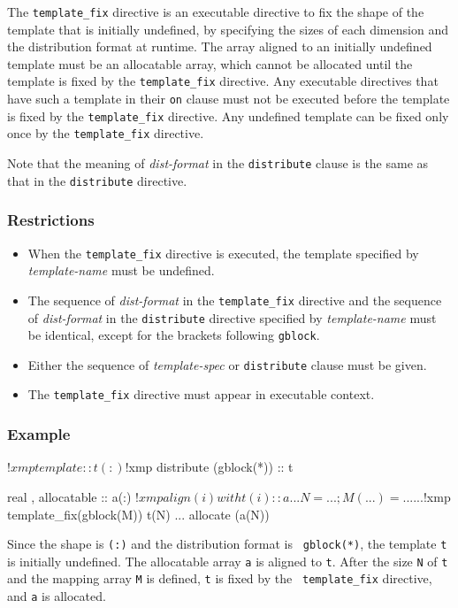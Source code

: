 The {\tt template\_fix} directive is an executable directive to fix the
shape of the template that is initially undefined, by specifying the
sizes of each dimension and the distribution format at runtime. The array
aligned to an initially undefined template must be an allocatable
array, which cannot be allocated until the template is fixed by the
{\tt template\_fix} directive. Any executable directives that have such a
template in their {\tt on} clause must not be executed before the
template is fixed by the
{\tt template\_fix} directive. Any undefined template can be fixed only
once by the {\tt template\_fix} directive. 

Note that the meaning of
{\it dist-format} in the {\tt distribute} clause is the same as that in
the {\tt distribute} directive.

\subsubsection*{Restrictions}
\begin{itemize}
\item When the {\tt template\_fix} directive is executed, the
template specified by {\it template-name} must be undefined.
\item The sequence
of {\it dist-format} in the {\tt template\_fix} directive and the
      sequence of {\it dist-format} in the {\tt distribute} directive
      specified by {\it template-name} must be identical, except for the
      brackets following {\tt gblock}. 
\item Either the sequence of {\it template-spec} or {\tt distribute}
  clause must be given. 
\item The {\tt template\_fix} directive must appear in executable
      context.
\end{itemize}

\subsubsection*{Example}

\begin{Fexample}
!$xmp template :: t(:)
!$xmp distribute (gblock(*)) :: t

      real , allocatable :: a(:)
!$xmp align (i) with t(i) :: a
      ...
      N = ...; M(...) = ...
      ...
!$xmp template_fix(gblock(M)) t(N)
      ...
      allocate (a(N))
\end{Fexample}

Since the shape is {\tt (:)} and the distribution format is {\tt
gblock(*)}, 
the template {\tt t} is initially undefined. The allocatable array
{\tt a} is aligned to {\tt t}. After the size {\tt N} of {\tt t} and the
mapping array {\tt M} is defined, {\tt t} is fixed by the {\tt
  template\_fix} directive, and {\tt a} is allocated.

